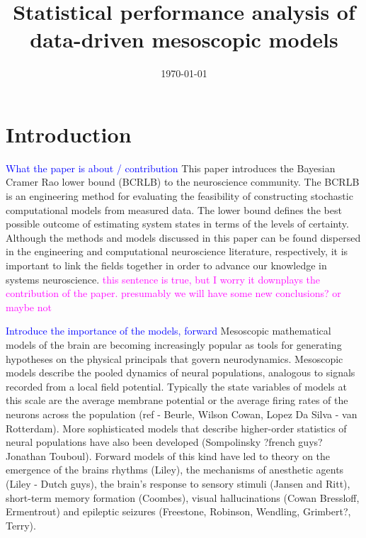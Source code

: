 \documentclass{article}
\title{Statistical performance analysis of data-driven mesoscopic models}
\date{\today}
\newcommand{\unit}[1]{\textcolor{magenta}{#1}}
\newcommand{\brian}[1]{\textcolor{blue}{#1}}
\begin{document}
\maketitle

\section{Introduction}
\label{sec:introduction}

\brian{What the paper is about / contribution}
This paper introduces the Bayesian Cramer Rao lower bound (BCRLB) to the neuroscience community. The BCRLB is an engineering method for evaluating the feasibility of constructing stochastic computational models from measured data. The lower bound defines the best possible outcome of estimating system states in terms of the levels of certainty. Although the methods and models discussed in this paper can be found dispersed in the engineering and computational neuroscience literature, respectively, it is important to link the fields together in order to advance our knowledge in systems neuroscience. \unit{this sentence is true, but I worry it downplays the contribution of the paper. presumably we will have some new conclusions? or maybe not}

\brian{Introduce the importance of the models, forward}
Mesoscopic mathematical models of the brain are becoming increasingly popular as tools for generating hypotheses on the physical principals that govern neurodynamics. Mesoscopic models describe the pooled dynamics of neural populations, analogous to signals recorded from a local field potential. Typically the state variables of models at this scale are the average membrane potential or the average firing rates of the neurons across the population (ref - Beurle, Wilson Cowan, Lopez Da Silva - van Rotterdam). More sophisticated models that describe higher-order statistics of neural populations have also been developed (Sompolinsky ?french guys? Jonathan Touboul). Forward models of this kind have led to theory on the emergence of the brains rhythms (Liley), the mechanisms of anesthetic agents (Liley - Dutch guys), the brain's response to sensory stimuli (Jansen and Ritt), short-term memory formation (Coombes), visual hallucinations (Cowan Bressloff, Ermentrout) and epileptic seizures (Freestone, Robinson, Wendling, Grimbert?, Terry). 
\end{document}
